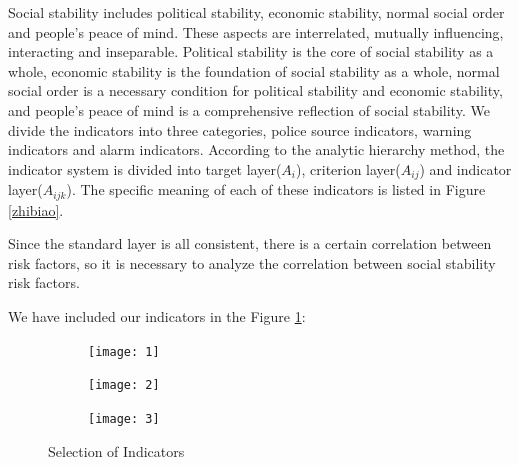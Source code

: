 \documentclass[12pt]{article}  %
\begin{document}
Social stability includes political stability, economic stability, normal social order and people's peace of mind. These aspects are interrelated, mutually influencing, interacting and inseparable. Political stability is the core of social stability as a whole, economic stability is the foundation of social stability as a whole, normal social order is a necessary condition for political stability and economic stability, and people's peace of mind is a comprehensive reflection of social stability. We divide the indicators into three categories, police source indicators, warning indicators and alarm indicators. According to the analytic hierarchy method, the indicator system is divided into target layer($A_i$), criterion layer($A_{ij}$) and indicator layer($A_{ijk}$). The specific meaning of each of these indicators is listed in Figure \ref{zhibiao}.

Since the standard layer is all consistent, there is a certain correlation between risk factors, so it is necessary to analyze the correlation between social stability risk factors.

We have included our indicators in the Figure \ref{soi}:
\begin{figure}[htbp]
\centering
\begin{subfigure}[b]{.32\textwidth}
\texttt{[image: 1]}
\end{subfigure}
\begin{subfigure}[b]{.32\textwidth}
\texttt{[image: 2]}
\end{subfigure}
\begin{subfigure}[b]{.32\textwidth}
\texttt{[image: 3]}
\end{subfigure}
\caption{Selection of Indicators}\label{soi}
\end{figure}
\end{document}
